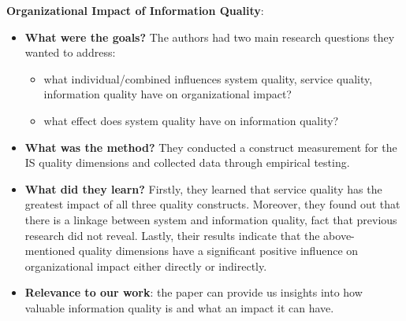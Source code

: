 \documentclass{mprop}
\begin{document}
\textbf{Organizational Impact of 
        Information Quality}\cite{gorla2010organizational}:
\begin{itemize}
  \item \textbf{What were the goals?}
    The authors had two main research questions they wanted to address:
      \begin{itemize}
        \item what individual/combined influences system quality, service quality,
          information quality have on organizational impact?
        \item what effect does system quality have on information quality?
      \end{itemize}
  \item \textbf{What was the method?}
    They conducted a construct measurement for the IS quality dimensions and 
    collected data through empirical testing.
  \item \textbf{What did they learn?}
    Firstly, they learned that service quality has the greatest impact 
    of all three quality constructs. Moreover, they found out that there is a 
    linkage between system and information quality, fact that previous research
    did not reveal. Lastly, their results indicate that the above-mentioned 
    quality dimensions have a significant positive influence on organizational
    impact either directly or indirectly.
  \item \textbf{Relevance to our work}: the paper can provide us insights into
    how valuable information quality is and what an impact it can have.
\end{itemize}
\end{document}
